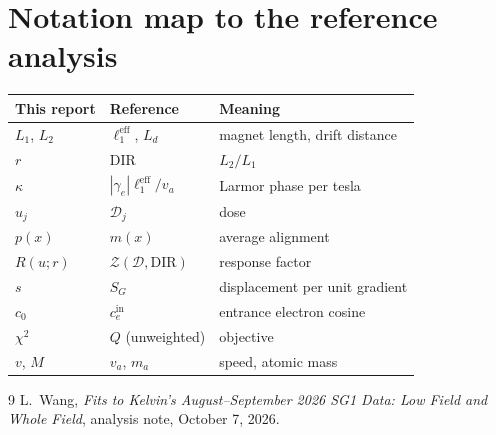 \documentclass[11pt,a4paper]{article}
\begin{document}
\section{Notation map to the reference analysis}
\begin{center}
\begin{tabular}{lll}
\toprule
This report & Reference~\cite{wang2026} & Meaning\\
\midrule
$L_1$, $L_2$  & $\ell_1^\text{eff}$, $L_d$ & magnet length, drift distance\\
$r$           & DIR & $L_2/L_1$\\
$\kappa$      & $|\gamma_e|\ell_1^\text{eff}/v_a$ & Larmor phase per tesla\\
$u_j$         & $\mathcal D_j$ & dose\\
$p(x)$        & $m(x)$ & average alignment\\
$R(u;r)$      & $\mathcal Z(\mathcal D,\text{DIR})$ & response factor\\
$s$           & $S_G$ & displacement per unit gradient\\
$c_0$         & $c_e^\text{in}$ & entrance electron cosine\\
$\chi^2$      & $Q$ (unweighted) & objective\\
$v$, $M$      & $v_a$, $m_a$ & speed, atomic mass\\
\bottomrule
\end{tabular}
\end{center}

\begin{thebibliography}{9}
 L.~Wang, \emph{Fits to Kelvin's August--September 2026 SG1 Data: Low Field and Whole Field}, analysis note, October 7, 2026.
\end{thebibliography}
\end{document}
